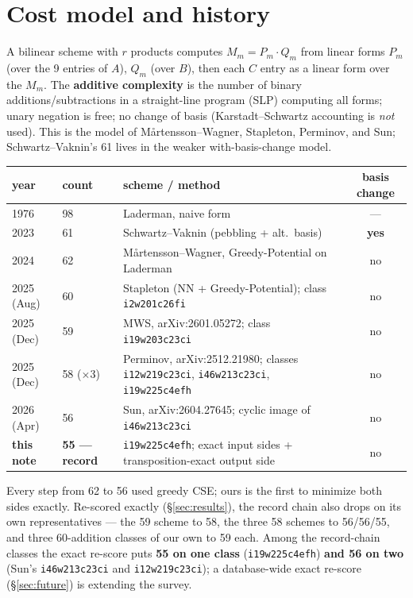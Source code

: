 \documentclass[10pt]{article}
\begin{document}
\section{Cost model and history}\label{sec:model}

A bilinear scheme with $r$ products computes $M_m = P_m \cdot Q_m$ from
linear forms $P_m$ (over the 9 entries of $A$), $Q_m$ (over $B$), then
each $C$ entry as a linear form over the $M_m$. The \textbf{additive
complexity} is the number of binary additions/subtractions in a
straight-line program (SLP) computing all forms; unary negation is
free; no change of basis (Karstadt--Schwartz accounting is \emph{not}
used). This is the model of M\aa rtensson--Wagner, Stapleton, Perminov,
and Sun; Schwartz--Vaknin's 61 lives in the weaker with-basis-change
model.

\begin{center}
\small
\begin{tabular}{@{}l l p{6.6cm} c@{}}
\toprule
year & count & scheme / method & basis change \\
\midrule
1976 & 98 & Laderman, naive form & --- \\
2023 & 61 & Schwartz--Vaknin (pebbling + alt.\ basis) & \textbf{yes} \\
2024 & 62 & M\aa rtensson--Wagner, Greedy-Potential on Laderman & no \\
2025 (Aug) & 60 & Stapleton (NN + Greedy-Potential); class
  \texttt{i2w201c26fi} & no \\
2025 (Dec) & 59 & MWS, arXiv:2601.05272; class \texttt{i19w203c23ci}
  & no \\
2025 (Dec) & 58 ($\times$3) & Perminov, arXiv:2512.21980; classes
  \texttt{i12w219c23ci}, \texttt{i46w213c23ci}, \texttt{i19w225c4efh}
  & no \\
2026 (Apr) & 56 & Sun, arXiv:2604.27645; cyclic image of
  \texttt{i46w213c23ci} & no \\
\textbf{this note} & \textbf{55 --- record} &
  \texttt{i19w225c4efh}; exact input sides + transposition-exact output
  side & no \\
\bottomrule
\end{tabular}
\end{center}

Every step from 62 to 56 used greedy CSE; ours is the first to minimize
both sides exactly. Re-scored exactly (\S\ref{sec:results}), the record
chain also drops on its own representatives --- the 59 scheme to 58,
the three 58 schemes to 56/56/55, and three 60-addition classes of our
own to 59 each. Among the record-chain classes the exact re-score puts
\textbf{55 on one class} (\texttt{i19w225c4efh}) \textbf{and 56 on
two} (Sun's \texttt{i46w213c23ci} and \texttt{i12w219c23ci}); a
database-wide exact re-score (\S\ref{sec:future}) is extending the
survey.
\end{document}
